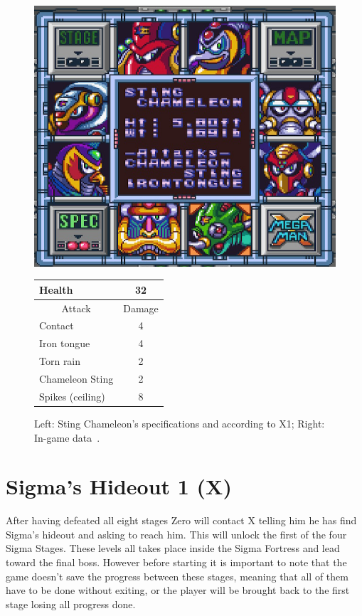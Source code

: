 \begin{figure}[htp]
	\begin{minipage}[c]{0.45\linewidth}
		\vspace{0pt}
		\centering
	\includegraphics[width=\linewidth]{figures/X1/Sting_chameleon/Sting_chameleon_specs.png}
	\end{minipage}
	\begin{minipage}[c]{0.45\linewidth}
		\centering
		\vspace{0pt}
		\begin{tabular}[h]{l c}
			\toprule
			Health  & 32\\
			\midrule
			\multicolumn{1}{c}{Attack} & \multicolumn{1}{c}{Damage}\\
			Contact & 4\\
			Iron tongue & 4\\
			Torn rain & 2\\
			Chameleon Sting & 2\\
			Spikes (ceiling) & 8\\
			\bottomrule
		\end{tabular}
	\end{minipage}
	\caption{Left: Sting Chameleon's specifications and according to X1; Right: In-game data~\cite{wiki:Sting_chameleon}. }
	\label{Chameleon_specs}
\end{figure}

\section{Sigma's Hideout 1 (X)}
After having defeated all eight stages Zero will contact X telling him he has find Sigma's hideout and asking to reach him. This will unlock the first of the four Sigma Stages. These levels all takes place inside the Sigma Fortress and lead toward the final boss. However before starting it is important to note that the game doesn't save the progress between these stages, meaning that all of them have to be done without exiting, or the player will be brought back to the first stage losing all progress done.

